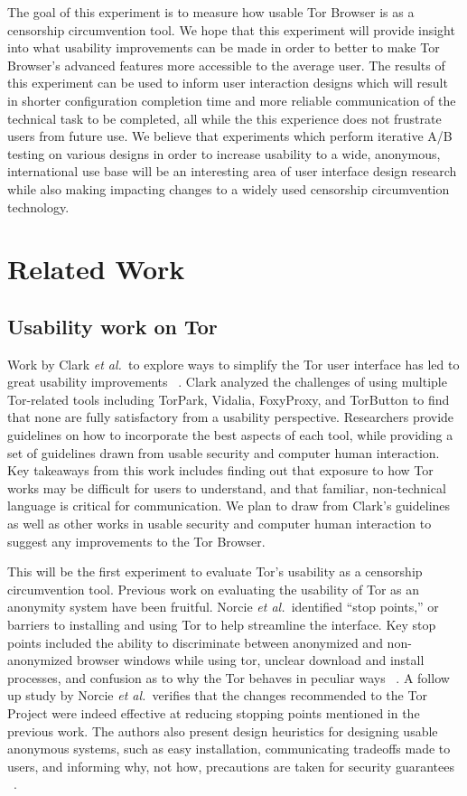 \documentclass[letterpaper,twocolumn,11pt]{article}
\def\etal{{\it et al.~}}
\begin{document}
The goal of this experiment is to measure how usable Tor Browser is as a censorship circumvention
tool. We hope that this experiment will provide insight into what usability improvements can be made 
in order to better to make Tor Browser's advanced features more accessible to the average user. The results
of this experiment can be used to inform user interaction designs which will result in shorter configuration
completion time and more reliable communication of the technical task to be completed, all while the 
this experience does not frustrate users from future use. We believe that experiments which perform
iterative A/B testing on various designs in order to increase usability to a wide, anonymous, international 
use base will be an interesting area of user interface design research while also making impacting changes
to a widely used censorship circumvention technology. 

\section{Related Work} %

\subsection{Usability work on Tor}
\indent \indent  Work by Clark \etal to explore ways to simplify the Tor user interface
has led to great usability improvements ~\cite{clark2007usability}.  Clark analyzed the challenges 
of using multiple Tor-related tools including TorPark, Vidalia, FoxyProxy, and TorButton to find that
none are fully satisfactory from a usability perspective. Researchers provide guidelines on 
how to incorporate the best aspects of each tool, while providing a set of guidelines drawn from
usable security and computer human interaction. Key takeaways from this work includes 
finding out that exposure to how Tor works may be difficult for users to understand, and that 
familiar, non-technical language is critical for communication. We plan to draw from Clark's
guidelines as well as other works in usable security and computer human interaction to suggest
any improvements to the Tor Browser. 

This will be the first experiment to evaluate Tor's usability as a censorship circumvention tool.
Previous work on evaluating the usability of Tor as an anonymity system have been fruitful. 
Norcie \etal identified ``stop points,'' or barriers to installing and using Tor to help streamline
the interface. Key stop points included the ability to discriminate between anonymized and non-
anonymized browser windows while using tor, unclear download and install processes, and 
confusion as to why the Tor behaves in peculiar ways ~\cite{norcie2012eliminating}. A follow up
study by Norcie \etal verifies that the changes recommended to the Tor Project were indeed 
effective at reducing stopping points mentioned in the previous work. The authors also present
design heuristics for designing usable anonymous systems, such as easy installation, communicating
tradeoffs made to users, and informing why, not how, precautions are taken for security guarantees ~\cite{norcie2014johnny}. 
\end{document}
